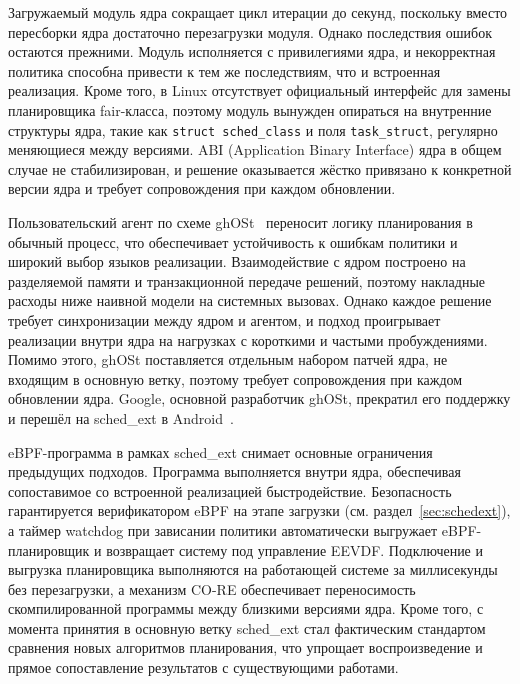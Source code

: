 \documentclass[14pt, oneside]{extbook}
\begin{document}
        Загружаемый модуль ядра сокращает цикл итерации до
        секунд, поскольку вместо пересборки ядра достаточно
        перезагрузки модуля. Однако последствия ошибок остаются
        прежними. Модуль исполняется с привилегиями ядра, и
        некорректная политика способна привести к тем же
        последствиям, что и встроенная реализация. Кроме того, в Linux отсутствует официальный
        интерфейс для замены планировщика fair-класса,
        поэтому модуль вынужден опираться на внутренние структуры
        ядра, такие как \texttt{struct sched\_class} и поля
        \texttt{task\_struct}, регулярно меняющиеся между версиями.
        ABI (Application Binary Interface) ядра в общем случае не стабилизирован, и решение
        оказывается жёстко привязано к конкретной версии ядра и
        требует сопровождения при каждом обновлении.

        Пользовательский агент по схеме ghOSt~\cite{ghost}
        переносит логику планирования в обычный процесс, что
        обеспечивает устойчивость к ошибкам политики и широкий
        выбор языков реализации. Взаимодействие с ядром построено
        на разделяемой памяти и транзакционной передаче решений,
        поэтому накладные расходы ниже наивной модели на системных
        вызовах. Однако каждое решение требует синхронизации
        между ядром и агентом, и подход проигрывает реализации
        внутри ядра на нагрузках с короткими и частыми
        пробуждениями. Помимо этого, ghOSt поставляется отдельным
        набором патчей ядра, не входящим в основную ветку, поэтому
        требует сопровождения при каждом обновлении ядра. Google,
        основной разработчик ghOSt, прекратил его поддержку и
        перешёл на sched\_ext в Android~\cite{lwn_schedext_lpc}.

        eBPF-программа в рамках sched\_ext снимает основные
        ограничения предыдущих подходов. Программа выполняется внутри
        ядра, обеспечивая сопоставимое со встроенной реализацией
        быстродействие.
        Безопасность гарантируется верификатором eBPF на этапе
        загрузки (см. раздел~\ref{sec:schedext}), а таймер watchdog при зависании политики
        автоматически выгружает eBPF-планировщик и возвращает систему
        под управление EEVDF.
        Подключение и выгрузка планировщика выполняются на работающей
        системе за миллисекунды без перезагрузки, а механизм CO-RE
        обеспечивает переносимость скомпилированной программы между
        близкими версиями ядра. Кроме того, с момента принятия
        в основную ветку sched\_ext стал фактическим стандартом
        сравнения новых алгоритмов планирования, что
        упрощает воспроизведение и прямое сопоставление
        результатов с существующими работами.
\end{document}

